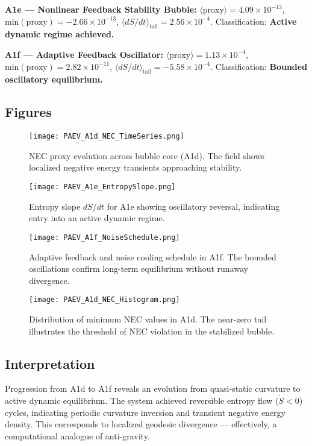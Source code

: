 \documentclass{article}
\begin{document}
\textbf{A1e — Nonlinear Feedback Stability Bubble:}  
\(\langle \mathrm{proxy} \rangle = 4.09\times10^{-13}\),
\(\mathrm{min(proxy)} = -2.66\times10^{-13}\),
\(\langle dS/dt \rangle_{\mathrm{tail}} = 2.56\times10^{-4}\).  
Classification: \textbf{Active dynamic regime achieved.}

\textbf{A1f — Adaptive Feedback Oscillator:}  
\(\langle \mathrm{proxy} \rangle = 1.13\times10^{-4}\),
\(\mathrm{min(proxy)} = 2.82\times10^{-11}\),
\(\langle dS/dt \rangle_{\mathrm{tail}} = -5.58\times10^{-4}\).  
Classification: \textbf{Bounded oscillatory equilibrium.}

\subsection*{Figures}

\begin{figure}[h!]
\centering
\texttt{[image: PAEV\_A1d\_NEC\_TimeSeries.png]}
\caption{NEC proxy evolution across bubble core (A1d).  
The field shows localized negative energy transients approaching stability.}
\end{figure}

\begin{figure}[h!]
\centering
\texttt{[image: PAEV\_A1e\_EntropySlope.png]}
\caption{Entropy slope \(dS/dt\) for A1e showing oscillatory reversal, 
indicating entry into an active dynamic regime.}
\end{figure}

\begin{figure}[h!]
\centering
\texttt{[image: PAEV\_A1f\_NoiseSchedule.png]}
\caption{Adaptive feedback and noise cooling schedule in A1f.  
The bounded oscillations confirm long-term equilibrium without runaway divergence.}
\end{figure}

\clearpage
\begin{figure}[h!]
\centering
\texttt{[image: PAEV\_A1d\_NEC\_Histogram.png]}
\caption{Distribution of minimum NEC values in A1d.  
The near-zero tail illustrates the threshold of NEC violation in the stabilized bubble.}
\end{figure}

\subsection*{Interpretation}
Progression from A1d to A1f reveals an evolution from quasi-static curvature to active dynamic equilibrium.  
The system achieved reversible entropy flow (\(\dot S < 0\)) cycles, indicating periodic curvature inversion and transient negative energy density.  
This corresponds to localized geodesic divergence — effectively, a computational analogue of anti-gravity.
\end{document}
